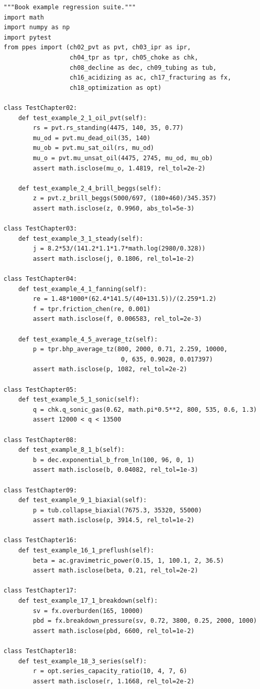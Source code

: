 \documentclass[11pt,a4paper,openany]{book}
\begin{document}
\begin{lstlisting}
"""Book example regression suite."""
import math
import numpy as np
import pytest
from ppes import (ch02_pvt as pvt, ch03_ipr as ipr,
                  ch04_tpr as tpr, ch05_choke as chk,
                  ch08_decline as dec, ch09_tubing as tub,
                  ch16_acidizing as ac, ch17_fracturing as fx,
                  ch18_optimization as opt)

class TestChapter02:
    def test_example_2_1_oil_pvt(self):
        rs = pvt.rs_standing(4475, 140, 35, 0.77)
        mu_od = pvt.mu_dead_oil(35, 140)
        mu_ob = pvt.mu_sat_oil(rs, mu_od)
        mu_o = pvt.mu_unsat_oil(4475, 2745, mu_od, mu_ob)
        assert math.isclose(mu_o, 1.4819, rel_tol=2e-2)

    def test_example_2_4_brill_beggs(self):
        z = pvt.z_brill_beggs(5000/697, (180+460)/345.357)
        assert math.isclose(z, 0.9960, abs_tol=5e-3)

class TestChapter03:
    def test_example_3_1_steady(self):
        j = 8.2*53/(141.2*1.1*1.7*math.log(2980/0.328))
        assert math.isclose(j, 0.1806, rel_tol=1e-2)

class TestChapter04:
    def test_example_4_1_fanning(self):
        re = 1.48*1000*(62.4*141.5/(40+131.5))/(2.259*1.2)
        f = tpr.friction_chen(re, 0.001)
        assert math.isclose(f, 0.006583, rel_tol=2e-3)

    def test_example_4_5_average_tz(self):
        p = tpr.bhp_average_tz(800, 2000, 0.71, 2.259, 10000,
                                0, 635, 0.9028, 0.017397)
        assert math.isclose(p, 1082, rel_tol=2e-2)

class TestChapter05:
    def test_example_5_1_sonic(self):
        q = chk.q_sonic_gas(0.62, math.pi*0.5**2, 800, 535, 0.6, 1.3)
        assert 12000 < q < 13500

class TestChapter08:
    def test_example_8_1_b(self):
        b = dec.exponential_b_from_ln(100, 96, 0, 1)
        assert math.isclose(b, 0.04082, rel_tol=1e-3)

class TestChapter09:
    def test_example_9_1_biaxial(self):
        p = tub.collapse_biaxial(7675.3, 35320, 55000)
        assert math.isclose(p, 3914.5, rel_tol=1e-2)

class TestChapter16:
    def test_example_16_1_preflush(self):
        beta = ac.gravimetric_power(0.15, 1, 100.1, 2, 36.5)
        assert math.isclose(beta, 0.21, rel_tol=2e-2)

class TestChapter17:
    def test_example_17_1_breakdown(self):
        sv = fx.overburden(165, 10000)
        pbd = fx.breakdown_pressure(sv, 0.72, 3800, 0.25, 2000, 1000)
        assert math.isclose(pbd, 6600, rel_tol=1e-2)

class TestChapter18:
    def test_example_18_3_series(self):
        r = opt.series_capacity_ratio(10, 4, 7, 6)
        assert math.isclose(r, 1.1668, rel_tol=2e-2)
\end{lstlisting}
\end{document}
